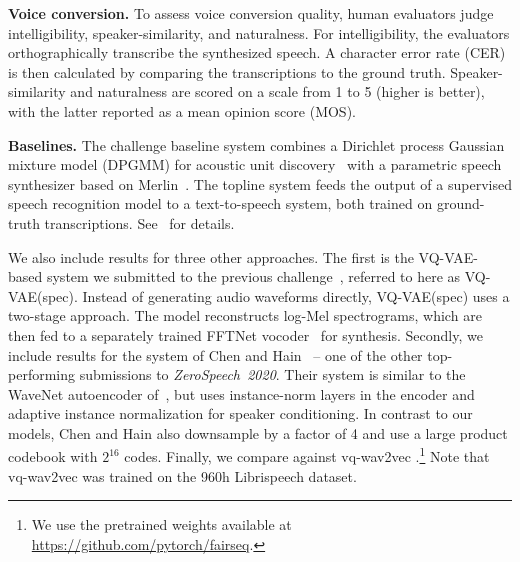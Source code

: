 \documentclass[a4paper]{article}
\begin{document}
\textbf{Voice conversion.}
To assess voice conversion quality, human evaluators judge intelligibility, speaker-similarity, and naturalness.
For intelligibility, the evaluators orthographically transcribe the synthesized speech. 
A character error rate (CER) is then calculated by comparing the transcriptions to the ground truth.
Speaker-similarity and naturalness are scored on a scale from 1 to 5 (higher is better), with the latter reported as a mean opinion score (MOS).



\textbf{Baselines.}
The challenge baseline system combines a Dirichlet process Gaussian mixture model (DPGMM) for acoustic unit discovery~\cite{ondel+etal_pcs16} with a
parametric speech synthesizer based on Merlin~\cite{wu+etal_ssw16}.
The topline system feeds the output of a supervised speech recognition model to a text-to-speech system, both trained on ground-truth transcriptions.
See~\cite{dunbar+etal_interspeech19} for details.


We also include results for three other approaches. 
The first is the VQ-VAE-based system we submitted to the previous challenge~\cite{eloff+etal_interspeech19}, referred to here as VQ-VAE(spec).
Instead of generating audio waveforms directly, VQ-VAE(spec) uses a two-stage approach.
The model reconstructs log-Mel spectrograms, which are then fed to a separately trained FFTNet vocoder~\cite{jin+etal_icassp18} for synthesis.
Secondly, we include results for the system of Chen and Hain~\cite{chen+hain_interspeech20} -- one of the other top-performing submissions to \textit{ZeroSpeech~2020}.
Their system is similar to the WaveNet autoencoder of~\cite{chorowski+etal_taslp19}, but uses instance-norm layers in the encoder and adaptive instance normalization for speaker conditioning. 
In contrast to our models, Chen and Hain also downsample by a factor of 4 and use a large product codebook with $2^{16}$ codes.
Finally, we compare against vq-wav2vec \cite{baevski+etal_iclr20}.\footnote{We use the pretrained weights available at \scriptsize{ \url{https://github.com/pytorch/fairseq}}.} Note that vq-wav2vec was trained on the 960h Librispeech dataset.
\end{document}
